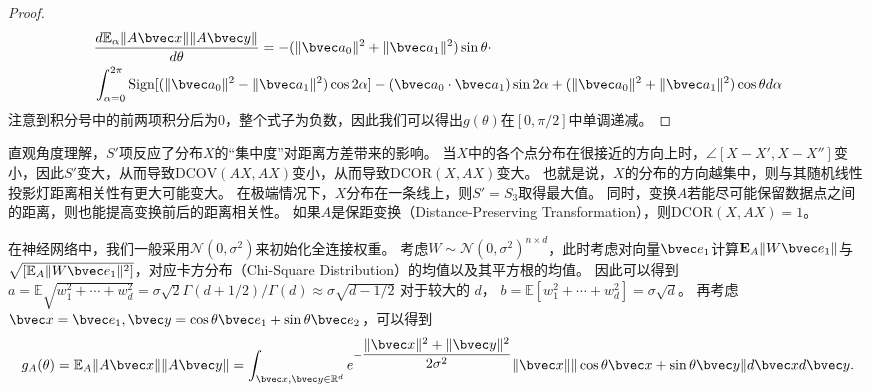\begin{proof}
\begin{equation}
        \begin{split}
            & \dfrac{d\mathbb E_\alpha \Vert A\bvec x \Vert \Vert A\bvec y \Vert}{d\theta} = 
            -(\Vert \bvec a_0 \Vert^2 + \Vert \bvec a_1 \Vert^2)\sin \theta \cdot \\
            & \int_{\alpha=0}^{2\pi} 
                \text{Sign}[(\Vert \bvec a_0 \Vert^2 - \Vert\bvec a_1\Vert^2)\cos 2 \alpha] - 
                (\bvec a_0 \cdot \bvec a_1) \sin 2\alpha + 
                (\Vert \bvec a_0 \Vert^2 + \Vert\bvec a_1\Vert^2) \cos \theta d\alpha
        \end{split}
    \end{equation}
    注意到积分号中的前两项积分后为0，整个式子为负数，因此我们可以得出$g(\theta)$在$[0, \pi/2]$中单调递减。
\end{proof}
%
直观角度理解，$S'$项反应了分布$X$的“集中度”对距离方差带来的影响。
%
当$X$中的各个点分布在很接近的方向上时，$\angle[X - X', X - X'']$变小，因此$S'$变大，从而导致$\text{DCOV}(AX, AX)$变小，从而导致$\text{DCOR}(X, AX)$变大。
%
也就是说，$X$的分布的方向越集中，则与其随机线性投影灯距离相关性有更大可能变大。
%
在极端情况下，$X$分布在一条线上，则$S' = S_3$取得最大值。
%
同时，变换$A$若能尽可能保留数据点之间的距离，则也能提高变换前后的距离相关性。
%
如果$A$是保距变换（Distance-Preserving Transformation），则$\text{DCOR}(X, AX) = 1$。


%
在神经网络中，我们一般采用$\mathcal N(0, \sigma^2)$来初始化全连接权重。
%
考虑$W \sim \mathcal N(0, \sigma^2)^{n \times d}$，此时考虑对向量$\bvec e_1$计算$\mathbf E_A \Vert W\bvec e_1 \Vert$与$\sqrt{\left[\mathbb E_A \Vert W\bvec e_1 \Vert^2 \right]}$，对应卡方分布（Chi-Square Distribution）的均值以及其平方根的均值。
%
因此可以得到
$a = \mathbb E \sqrt{w_1^2 + \cdots + w_d^2} = \sigma \sqrt{2} \Gamma(d + 1/2) / \Gamma(d) \approx \sigma \sqrt{d - 1/2}$ 对于较大的 $d$，                    
$b = \mathbb E \left[ {w_1^2 + \cdots + w_d^2} \right] = \sigma\sqrt{d}$。
%
再考虑$\bvec x = \bvec e_1, \bvec y = \cos \theta \bvec e_1 + \sin \theta \bvec e_2$，可以得到
\begin{equation}
    g_A(\theta) = \mathbb E_A \Vert A\bvec x \Vert \Vert A \bvec y \Vert = \int_{\bvec x, \bvec y \in \mathbb R^d} e^{-\dfrac{\Vert \bvec x \Vert^2 + \Vert \bvec y \Vert^2}{2\sigma^2}}
\Vert \bvec x \Vert \Vert \cos \theta \bvec x + \sin \theta \bvec y \Vert d\bvec x d\bvec y.
\end{equation}

